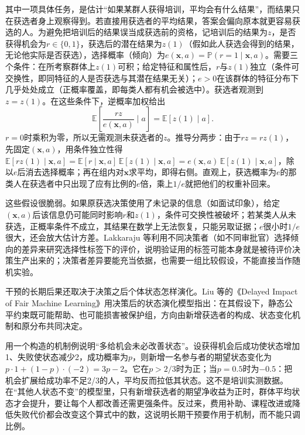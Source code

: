 其中一项具体任务，是估计“如果某群人获得培训，平均会有什么结果”，而结果只在获选者身上观察得到。若直接用获选者的平均结果，答案会偏向原本就更容易获选的人。为避免把培训后的结果误当成获选前的资格，记培训后的结果为$z$，是否获得机会为$r\in\{0,1\}$，获选后的潜在结果为$z(1)$（假如此人获选会得到的结果，无论他实际是否获选），选择概率（倾向）为$e(\bm{x},a)=\mathbb P(r=1\mid\bm{x},a)$。需要三个条件：在所考察群体上$z(1)$可积；给定特征和属性后，$r$与$z(1)$独立（条件可交换性，即同特征的人是否获选与其潜在结果无关）；$e>0$在该群体的特征分布下几乎处处成立（正概率覆盖，即每类人都有机会被选中）。获选者观测到$z=z(1)$。在这些条件下，逆概率加权给出
\begin{equation}
 \mathbb E\!\left[\frac{r z}{e(\bm{x},a)}\mid a\right]
 =\mathbb E[z(1)\mid a].
 \label{eq:fairness-selective-weight}
\end{equation}
$r=0$时乘积为零，所以无需观测未获选者的$z$。推导分两步：由于$rz=rz(1)$，先固定$(\bm x,a)$，用条件独立性得$\mathbb E[rz(1)\mid\bm x,a]=\mathbb E[r\mid\bm x,a]\,\mathbb E[z(1)\mid\bm x,a]=e(\bm x,a)\,\mathbb E[z(1)\mid\bm x,a]$，除以$e$后消去选择概率；再在组内对$\bm x$求平均，即得右侧。直观上，获选概率为$e$的那类人在获选者中只出现了应有比例的$e$倍，乘上$1/e$就把他们的权重补回来。

这些假设很脆弱。如果原获选决策使用了未记录的信息（如面试印象），给定$(\bm{x},a)$后该信息仍可能同时影响$r$和$z(1)$，条件可交换性被破坏；若某类人从未获选，正概率条件不成立，其结果在数学上无法恢复，只能另取证据；$e$很小时$1/e$很大，还会放大估计方差。Lakkaraju 等利用不同决策者（如不同审批官）选择倾向的差异来研究选择性标签下的评价，说明验证用的标签可能本身就是被待评价决策生产出来的；决策者差异要能充当依据，也需要一组比较假设，不能直接当作随机实验。

干预的长期后果还取决于决策之后个体状态怎样演化。Liu 等的《Delayed Impact of Fair Machine Learning》用决策后的状态演化模型指出：在其假设下，静态公平约束既可能帮助、也可能损害被保护组，方向由新增获选者的构成、状态变化机制和原分布共同决定。

用一个构造的机制例说明“多给机会未必改善状态”。设获得机会后成功使状态增加1、失败使状态减少2，成功概率为$p$，则新增一名参与者的期望状态变化为$p\cdot1+(1-p)\cdot(-2)=3p-2$。它在$p>2/3$时为正；当$p=0.5$时为$-0.5$：把机会扩展给成功率不足2/3的人，平均反而拉低其状态。这不是培训实测数据。在“其他人状态不变”的模型里，只有新增获选者的期望净收益为正时，群体平均状态才会提升，要让每个人都改善还需更强条件。反过来，费用补助、课程改进或降低失败代价都会改变这个算式中的数，这说明长期干预要作用于机制，而不能只调比例。

